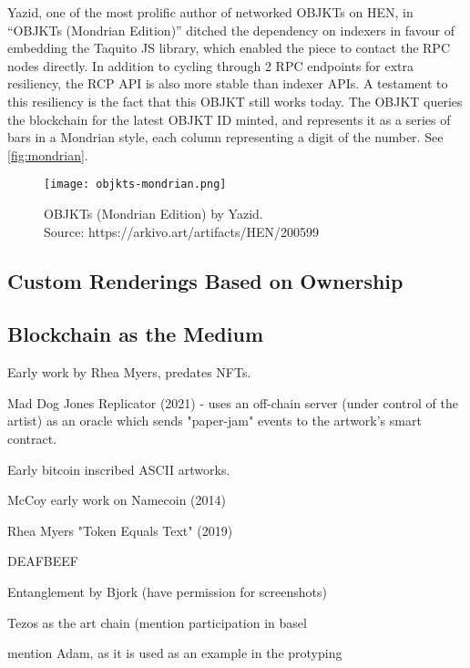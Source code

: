 Yazid, one of the most prolific author of networked OBJKTs on HEN, in ``OBJKTs (Mondrian Edition)'' ditched the dependency on indexers in favour of embedding the Taquito JS library, which enabled the piece to contact the RPC nodes directly. In addition to cycling through 2 RPC endpoints for extra resiliency, the RCP API is also more stable than indexer APIs. A testament to this resiliency is the fact that this OBJKT still works today. The OBJKT queries the blockchain for the latest OBJKT ID minted, and represents it as a series of bars in a Mondrian style, each column representing a digit of the number. See \autoref{fig:mondrian}.

\begin{figure}[h]
    \centering
    \captionsetup{justification=centering}
    \texttt{[image: objkts-mondrian.png]}
    \captionsetup{justification=centering}
    \caption[OBJKTs (Mondrian Edition) by Yazid]{OBJKTs (Mondrian Edition) by Yazid. \\ Source: https://arkivo.art/artifacts/HEN/200599}
    \label{fig:mondrian}
\end{figure}


\subsection{Custom Renderings Based on Ownership}





\subsection{Blockchain as the Medium}

Early work by Rhea Myers, predates NFTs.

Mad Dog Jones Replicator (2021) - uses an off-chain server (under control of the artist) as an oracle which sends "paper-jam" events to the artwork's smart contract.



Early bitcoin inscribed ASCII artworks.

McCoy early work on Namecoin (2014)


Rhea Myers "Token Equals Text" (2019)

DEAFBEEF

Entanglement by Bjork (have permission for screenshots)


Tezos as the art chain (mention participation in basel


\todo mention Adam, as it is used as an example in the protyping


